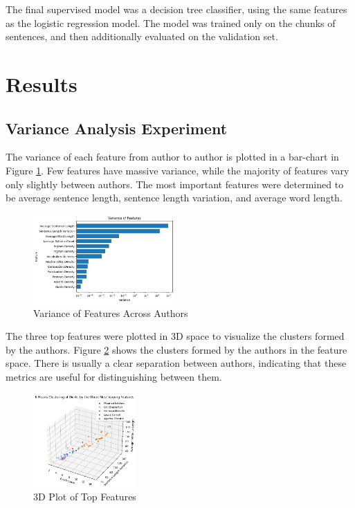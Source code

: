 \documentclass[journal]{IEEEtran} %
\begin{document}
The final supervised model was a decision tree classifier, using the same features as the logistic regression model. The model was trained only on the chunks of sentences, and then additionally evaluated on the validation set.

\section{Results}

\subsection{Variance Analysis Experiment}

The variance of each feature from author to author is plotted in a bar-chart in Figure \ref{vary1}. Few features have massive variance, while the majority of features vary only slightly between authors. The most important features were determined to be average sentence length, sentence length variation, and average word length.

\begin{figure}
    \caption{Variance of Features Across Authors}
    \begin{center}
    \centerline{\includegraphics[width=0.48\textwidth]{./vary1.png}}
    \end{center}
    \centering
    \label{vary1}
\end{figure}

The three top features were plotted in 3D space to visualize the clusters formed by the authors. Figure \ref{vary2} shows the clusters formed by the authors in the feature space. There is usually a clear separation between authors, indicating that these metrics are useful for distinguishing between them.

\begin{figure}[h!]
    \caption{3D Plot of Top Features}
    \begin{center}
    \centerline{\includegraphics[width=0.35\textwidth]{./vary2.png}}
    \end{center}
    \centering
    \label{vary2}
\end{figure}
\end{document}
